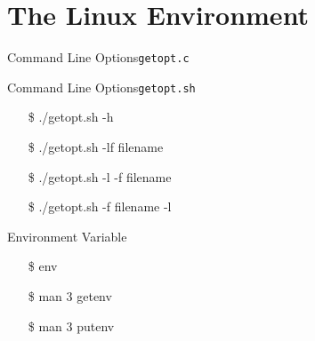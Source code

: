 \section{The Linux Environment}
\label{sec:linux-environment}

\begin{frame}{Command Line Options}{\texttt{getopt.c}}
  \begin{center}
  \end{center}
  \qquad\qquad{}
\end{frame}

\begin{frame}{Command Line Options}{\texttt{getopt.sh}}
  \begin{center}
  \end{center}
  \ttfamily
  \begin{itemize}
  \item[\$] ./getopt.sh -h
  \item[\$] ./getopt.sh -lf filename
  \item[\$] ./getopt.sh -l -f filename
  \item[\$] ./getopt.sh -f filename -l
  \end{itemize}
\end{frame}

\begin{frame}{Environment Variable}
  \begin{minipage}{.5\linewidth}
    \begin{center}
    \end{center}
  \end{minipage}\quad
  \begin{minipage}{.45\linewidth}
  \ttfamily
  \begin{itemize}
  \item[\$] env
  \item[\$] man 3 getenv
  \item[\$] man 3 putenv
  \end{itemize}  
  \end{minipage}
\end{frame}

